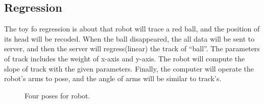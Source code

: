 \documentclass{article}
\begin{document}
\subsection{Regression}
\label{sec:toy:r}

The toy fo regression is about that robot will trace a red ball, and the position of its head will be recoded.
When the ball disappeared, the all data will be sent to server, and then the server will regress(linear) the track of
``ball''. The parameters of track includes the weight of x-axis and y-axis. The robot will compute the slope of track
with the given parameters. Finally, the computer will operate the robot's arms to pose, and the angle of arms will be
similar to  track's.

\begin{figure}
	\centering
	
	\caption{Four poses for robot.}
	\label{fig:pose}
\end{figure}
\end{document}
